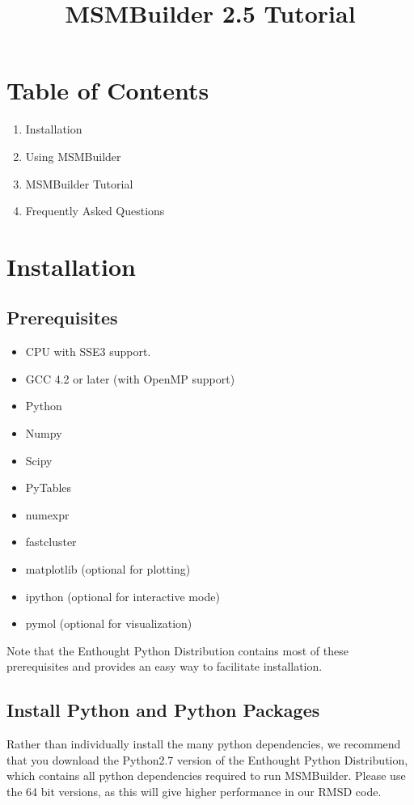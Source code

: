 \documentclass[12pt]{article}
\title
{MSMBuilder 2.5 Tutorial
}
\begin{document}
\maketitle

\section{Table of Contents}
\begin{enumerate}
\item Installation
\item Using MSMBuilder
\item MSMBuilder Tutorial
\item Frequently Asked Questions
\end{enumerate}

\newpage

\section{Installation}

\subsection{Prerequisites}
\begin{itemize}
 \item CPU with SSE3 support.
\item GCC 4.2 or later (with OpenMP support)
\item Python
\item Numpy
\item Scipy
\item PyTables
\item numexpr
\item fastcluster
\item matplotlib (optional for plotting)
\item ipython (optional for interactive mode)
\item pymol (optional for visualization)
\end{itemize}
Note that the Enthought Python Distribution contains most of these prerequisites and provides an easy way to facilitate installation.

\subsection{Install Python and Python Packages}

Rather than individually install the many python dependencies, we recommend that you download the Python2.7 version of the Enthought Python Distribution, which contains all python dependencies required to run MSMBuilder.  Please use the 64 bit versions, as this will give higher performance in our RMSD code.
\end{document}
